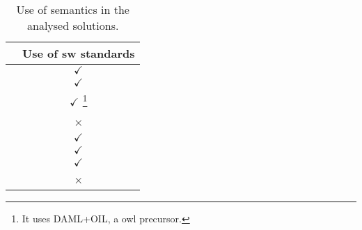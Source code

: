 \begin{savenotes}
  \begin{table}[htbp]
    \caption{Use of semantics in the analysed solutions.}
    \centering
    \begin{tabular}{ l c }
      \hline 
      & Use of \ac{sw} standards \\
      \hline 
      \midtsc{} & $\checkmark$ \\
      \midsws{} & $\checkmark$ \\
      \midstuples{} & $\checkmark$ \footnote{It uses DAML+OIL, a \ac{owl} precursor.} \\
      \midcspaces{} & × \\
      \midtscpp{} & $\checkmark$ \\
      \midtripcom{} & $\checkmark$ \\
      \midsmartmt{} & $\checkmark$ \\
      \midnardini{} & × \\
      \hline 
    \end{tabular}
    \label{tab:semantics_comparison}
  \end{table}
\end{savenotes}

